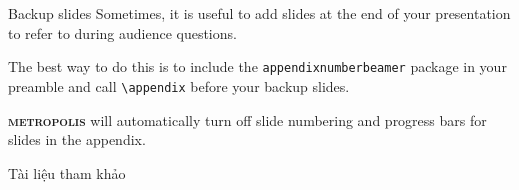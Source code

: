 \documentclass[10pt]{beamer}
\newcommand{\themename}{\textbf{\textsc{metropolis}}\xspace}
\begin{document}
\appendix

\begin{frame}[fragile]{Backup slides}
  Sometimes, it is useful to add slides at the end of your presentation to
  refer to during audience questions.

  The best way to do this is to include the \verb|appendixnumberbeamer|
  package in your preamble and call \verb|\appendix| before your backup slides.

  \themename will automatically turn off slide numbering and progress bars for
  slides in the appendix.
\end{frame}

\begin{frame}[allowframebreaks]{Tài liệu tham khảo}
  
  
\end{frame}
\end{document}
